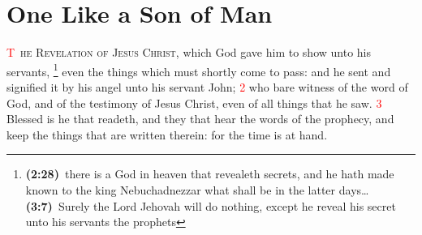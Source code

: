 \documentclass[12pt,twoside]{memoir}
\newcommand{\cbibleref}[3]{\textbf{\ibibleverse{#1}(#2)}\ {#3}}
\newcommand{\cbiblefootduo}[6]{\footnote{\cbibleref{#1}{#2}{#3}\ldots \cbibleref{#4}{#5}{#6}}}
\newcommand{\vnum}[1]{\textcolor{red}{\normalsize{#1}}}
\newcommand{\blankpage}{\newpage
\thispagestyle{plain} %
\mbox{}}
\begin{document}
\ClearShipoutPicture
{}

\blankpage
\clearpage
\clearpage

\tableofcontents
\clearpage
\listoffigures
\clearpage
\ClearShipoutPicture
{}

\pagestyle{headings}
\mainmatter
\trimFrame
\chapter{One Like a Son of Man}
\lettrine[lines=4]{\textcolor{red}{T}}{\ he Revelation of Jesus Christ}, which God gave him to show unto his servants,%
	\cbiblefootduo{Daniel}{2:28}{there is a God in heaven that revealeth secrets, and he hath made known to the king Nebuchadnezzar what shall be in the latter days}%
			{Amos}{3:7}{Surely the Lord Jehovah will do nothing, except he reveal his secret unto his servants the prophets}%
even the things which must shortly come to pass: and he sent and signified it by his angel unto his servant John; %
\vnum{2} who bare witness of the word of God, and of the testimony of Jesus Christ, even of all things that he saw. %
\vnum{3} Blessed is he that readeth, and they that hear the words of the prophecy, and keep the things that are written therein: for the time is at hand.
\end{document}
